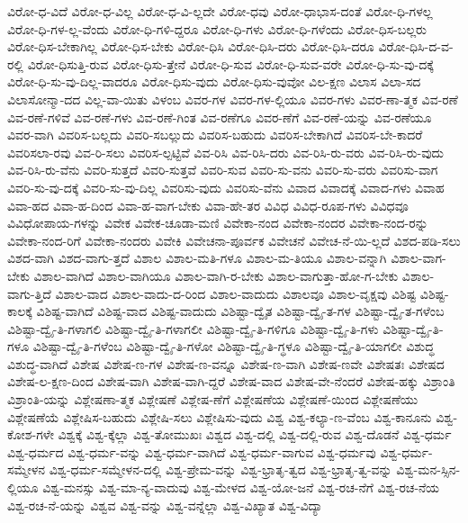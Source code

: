 {ವಿರೋ-ಧ-ವಿದೆ
ವಿರೋ-ಧ-ವಿಲ್ಲ
ವಿರೋ-ಧ-ವಿ-ಲ್ಲದೇ
ವಿರೋ-ಧವು
ವಿರೋ-ಧಾಭಾಸ-ದಂತೆ
ವಿರೋ-ಧಿ-ಗಳಲ್ಲ
ವಿರೋ-ಧಿ-ಗಳ-ಲ್ಲ-ವೆಂದು
ವಿರೋ-ಧಿ-ಗಳಿ-ದ್ದರೂ
ವಿರೋ-ಧಿ-ಗಳು
ವಿರೋ-ಧಿ-ಗಳೆಂದು
ವಿರೋ-ಧಿಸ-ಬಲ್ಲರು
ವಿರೋ-ಧಿಸ-ಬೇಕಾಗಿಲ್ಲ
ವಿರೋ-ಧಿಸ-ಬೇಕು
ವಿರೋ-ಧಿಸಿ
ವಿರೋ-ಧಿಸಿ-ದರು
ವಿರೋ-ಧಿಸಿ-ದರೂ
ವಿರೋ-ಧಿಸಿ-ದ-ವ-ರಲ್ಲಿ
ವಿರೋ-ಧಿಸುತ್ತಿ-ರುವ
ವಿರೋ-ಧಿಸು-ತ್ತೇನೆ
ವಿರೋ-ಧಿ-ಸುವ
ವಿರೋ-ಧಿ-ಸುವ-ವರೇ
ವಿರೋ-ಧಿ-ಸು-ವು-ದಕ್ಕೆ
ವಿರೋ-ಧಿ-ಸು-ವು-ದಿಲ್ಲ-ವಾದರೂ
ವಿರೋ-ಧಿಸು-ವುದು
ವಿರೋ-ಧಿಸು-ವುವೋ
ವಿಲ-ಕ್ಷಣ
ವಿಲಾಸ
ವಿಲಾ-ಸದ
ವಿಲಾಸೋನ್ಮಾ-ದದ
ವಿಲ್ಲ-ವಾ-ಯಿತು
ವಿಳಂಬ
ವಿವರ-ಗಳ
ವಿವರ-ಗಳ-ಲ್ಲಿಯೂ
ವಿವರ-ಗಳು
ವಿವರ-ಣಾ-ತ್ಮಕ
ವಿವ-ರಣೆ
ವಿವ-ರಣೆ-ಗಳಿವೆ
ವಿವ-ರಣೆ-ಗಳು
ವಿವ-ರಣೆ-ಗಿಂತ
ವಿವ-ರಣೆಗೂ
ವಿವರ-ಣೆಗೆ
ವಿವ-ರಣೆ-ಯನ್ನು
ವಿವ-ರಣೆಯೂ
ವಿವರ-ವಾಗಿ
ವಿವರಿಸ-ಬಲ್ಲದು
ವಿವರಿ-ಸಬಲ್ಲುದು
ವಿವರಿಸ-ಬಹುದು
ವಿವರಿಸ-ಬೇಕಾಗಿದೆ
ವಿವರಿಸ-ಬೇ-ಕಾದರೆ
ವಿವರಿಸಲಾ-ರವು
ವಿವ-ರಿ-ಸಲು
ವಿವರಿಸ-ಲ್ಪಟ್ಟಿವೆ
ವಿವ-ರಿಸಿ
ವಿವ-ರಿಸಿ-ದರು
ವಿವ-ರಿಸಿ-ರು-ವರು
ವಿವ-ರಿಸಿ-ರು-ವುದು
ವಿವ-ರಿಸಿ-ರು-ವೆನು
ವಿವರಿ-ಸುತ್ತದೆ
ವಿವರಿ-ಸುತ್ತವೆ
ವಿವರಿ-ಸುವ
ವಿವರಿ-ಸು-ವನು
ವಿವರಿ-ಸು-ವರು
ವಿವರಿಸು-ವಾಗ
ವಿವರಿ-ಸು-ವು-ದಕ್ಕೆ
ವಿವರಿ-ಸು-ವು-ದಿಲ್ಲ
ವಿವರಿಸು-ವುದು
ವಿವರಿಸು-ವೆನು
ವಿವಾದ
ವಿವಾದಕ್ಕೆ
ವಿವಾದ-ಗಳು
ವಿವಾಹ
ವಿವಾ-ಹದ
ವಿವಾ-ಹ-ದಿಂದ
ವಿವಾ-ಹ-ವಾಗ-ಬೇಕು
ವಿವಾ-ಹೇ-ತರ
ವಿವಿಧ
ವಿವಿಧ-ರೂಪ-ಗಳು
ವಿವಿಧವೂ
ವಿವಿಧೋಪಾಯ-ಗಳನ್ನು
ವಿವೇಕ
ವಿವೇಕ-ಚೂಡಾ-ಮಣಿ
ವಿವೇಕಾ-ನಂದ
ವಿವೇಕಾ-ನಂದರ
ವಿವೇಕಾ-ನಂದ-ರನ್ನು
ವಿವೇಕಾ-ನಂದ-ರಿಗೆ
ವಿವೇಕಾ-ನಂದರು
ವಿವೇಕಿ
ವಿವೇಚನಾ-ಪೂರ್ವಕ
ವಿವೇಚನೆ
ವಿವೇಚ-ನೆ-ಯಿ-ಲ್ಲದೆ
ವಿಶದ-ಪಡಿ-ಸಲು
ವಿಶದ-ವಾಗಿ
ವಿಶದ-ವಾಗು-ತ್ತದೆ
ವಿಶಾಲ
ವಿಶಾಲ-ಮತಿ-ಗಳೂ
ವಿಶಾಲ-ಮ-ತಿಯೂ
ವಿಶಾಲ-ವನ್ನಾಗಿ
ವಿಶಾಲ-ವಾಗ-ಬೇಕು
ವಿಶಾಲ-ವಾಗಿದೆ
ವಿಶಾಲ-ವಾಗಿಯೂ
ವಿಶಾಲ-ವಾಗಿ-ರ-ಬೇಕು
ವಿಶಾಲ-ವಾಗುತ್ತಾ-ಹೋ-ಗ-ಬೇಕು
ವಿಶಾಲ-ವಾಗು-ತ್ತಿದೆ
ವಿಶಾಲ-ವಾದ
ವಿಶಾಲ-ವಾದು-ದ-ರಿಂದ
ವಿಶಾಲ-ವಾದುದು
ವಿಶಾಲವೂ
ವಿಶಾಲ-ವೃಕ್ಷವು
ವಿಶಿಷ್ಟ
ವಿಶಿಷ್ಟ-ಕಾಲಕ್ಕೆ
ವಿಶಿಷ್ಟ-ವಾಗಿದೆ
ವಿಶಿಷ್ಟ-ವಾದ
ವಿಶಿಷ್ಟ-ವಾದುದು
ವಿಶಿಷ್ಟಾ-ದ್ವೈತ
ವಿಶಿಷ್ಟಾ-ದ್ವೈ-ತ-ಗಳ
ವಿಶಿಷ್ಟಾ-ದ್ವೈ-ತ-ಗಳೆಂಬ
ವಿಶಿಷ್ಟಾ-ದ್ವೈ-ತಿ-ಗಳಾಗಲಿ
ವಿಶಿಷ್ಟಾ-ದ್ವೈ-ತಿ-ಗಳಾಗಲೀ
ವಿಶಿಷ್ಟಾ-ದ್ವೈ-ತಿ-ಗಳಿಗೂ
ವಿಶಿಷ್ಟಾ-ದ್ವೈ-ತಿ-ಗಳು
ವಿಶಿಷ್ಟಾ-ದ್ವೈ-ತಿ-ಗಳೂ
ವಿಶಿಷ್ಟಾ-ದ್ವೈ-ತಿ-ಗಳೆಂಬ
ವಿಶಿಷ್ಟಾ-ದ್ವೈ-ತಿ-ಗಳೋ
ವಿಶಿಷ್ಟಾ-ದ್ವೈ-ತಿ-ಗ್ಧಳೂ
ವಿಶಿಷ್ಟಾ-ದ್ವೈ-ತಿ-ಯಾಗಲೀ
ವಿಶುದ್ಧ
ವಿಶುದ್ಧ-ವಾಗಿದೆ
ವಿಶೇಷ
ವಿಶೇಷ-ಣ-ಗಳ
ವಿಶೇಷ-ಣ-ವನ್ನೂ
ವಿಶೇಷ-ಣ-ವಾಗಿ
ವಿಶೇಷ-ಣವೇ
ವಿಶೇಷತಃ
ವಿಶೇಷದ
ವಿಶೇಷ-ಲ-ಕ್ಷಣ-ದಿಂದ
ವಿಶೇಷ-ವಾಗಿ
ವಿಶೇಷ-ವಾಗಿ-ದ್ದರೆ
ವಿಶೇಷ-ವಾದ
ವಿಶೇಷ-ವೇ-ನೆಂದರೆ
ವಿಶೇಷ-ಹಕ್ಕು
ವಿಶ್ರಾಂತಿ
ವಿಶ್ರಾಂತಿ-ಯನ್ನು
ವಿಶ್ಲೇಷಣಾ-ತ್ಮಕ
ವಿಶ್ಲೇಷಣೆ
ವಿಶ್ಲೇಷ-ಣೆಗೆ
ವಿಶ್ಲೇಷಣೆಯ
ವಿಶ್ಲೇಷಣೆ-ಯಿಂದ
ವಿಶ್ಲೇಷಣೆಯು
ವಿಶ್ಲೇಷಣೆಯೆ
ವಿಶ್ಲೇಷಿಸ-ಬಹುದು
ವಿಶ್ಲೇಷಿ-ಸಲು
ವಿಶ್ಲೇಷಿಸು-ವುದು
ವಿಶ್ವ
ವಿಶ್ವ-ಕಲ್ಯಾ-ಣ-ವೆಂಬ
ವಿಶ್ವ-ಕಾನೂನು
ವಿಶ್ವ-ಕೋಶ-ಗಳೇ
ವಿಶ್ವಕ್ಕೆ
ವಿಶ್ವ-ಕ್ಕೆಲ್ಲಾ
ವಿಶ್ವ-ತೋಮುಖಃ
ವಿಶ್ವದ
ವಿಶ್ವ-ದಲ್ಲಿ
ವಿಶ್ವ-ದಲ್ಲಿ-ರುವ
ವಿಶ್ವ-ದೊಡನೆ
ವಿಶ್ವ-ಧರ್ಮ
ವಿಶ್ವ-ಧರ್ಮದ
ವಿಶ್ವ-ಧರ್ಮ-ವನ್ನು
ವಿಶ್ವ-ಧರ್ಮ-ವಾಗಿದೆ
ವಿಶ್ವ-ಧರ್ಮ-ವಾಗುವ
ವಿಶ್ವ-ಧರ್ಮವು
ವಿಶ್ವ-ಧರ್ಮ-ಸಮ್ಮೇಳನ
ವಿಶ್ವ-ಧರ್ಮ-ಸಮ್ಮೇಳನ-ದಲ್ಲಿ
ವಿಶ್ವ-ಪ್ರೇಮ-ವನ್ನು
ವಿಶ್ವ-ಭ್ರಾತೃ-ತ್ವದ
ವಿಶ್ವ-ಭ್ರಾತೃ-ತ್ವ-ವನ್ನು
ವಿಶ್ವ-ಮನ-ಸ್ಸಿನ-ಲ್ಲಿಯೂ
ವಿಶ್ವ-ಮನಸ್ಸು
ವಿಶ್ವ-ಮಾ-ನ್ಯ-ವಾದುವು
ವಿಶ್ವ-ಮೇಳದ
ವಿಶ್ವ-ಯೋ-ಜನೆ
ವಿಶ್ವ-ರಚ-ನೆಗೆ
ವಿಶ್ವ-ರಚ-ನೆಯ
ವಿಶ್ವ-ರಚ-ನೆ-ಯನ್ನು
ವಿಶ್ವವ
ವಿಶ್ವ-ವನ್ನು
ವಿಶ್ವ-ವನ್ನೆಲ್ಲಾ
ವಿಶ್ವ-ವಿಖ್ಯಾತ
ವಿಶ್ವ-ವಿದ್ಯಾ
}
